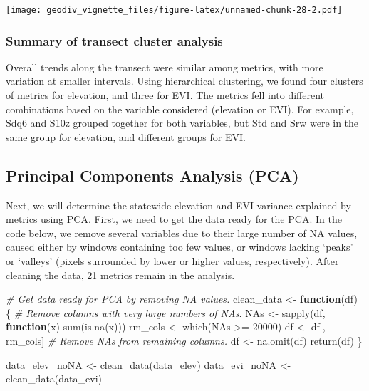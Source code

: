 \documentclass[
]{article}
\newenvironment{Shaded}{\begin{snugshade}}{\end{snugshade}}
\newcommand{\CommentTok}[1]{\textcolor[rgb]{0.56,0.35,0.01}{\textit{#1}}}
\newcommand{\ControlFlowTok}[1]{\textcolor[rgb]{0.13,0.29,0.53}{\textbf{#1}}}
\newcommand{\DecValTok}[1]{\textcolor[rgb]{0.00,0.00,0.81}{#1}}
\newcommand{\FunctionTok}[1]{\textcolor[rgb]{0.00,0.00,0.00}{#1}}
\newcommand{\NormalTok}[1]{#1}
\newcommand{\OtherTok}[1]{\textcolor[rgb]{0.56,0.35,0.01}{#1}}
\newcommand{\SpecialCharTok}[1]{\textcolor[rgb]{0.00,0.00,0.00}{#1}}
\begin{document}
\texttt{[image: geodiv\_vignette\_files/figure-latex/unnamed-chunk-28-2.pdf]}

\hypertarget{summary-of-transect-cluster-analysis}{%
\subsubsection{Summary of transect cluster
analysis}\label{summary-of-transect-cluster-analysis}}

Overall trends along the transect were similar among metrics, with more
variation at smaller intervals. Using hierarchical clustering, we found
four clusters of metrics for elevation, and three for EVI. The metrics
fell into different combinations based on the variable considered
(elevation or EVI). For example, Sdq6 and S10z grouped together for both
variables, but Std and Srw were in the same group for elevation, and
different groups for EVI.

\hypertarget{principal-components-analysis-pca}{%
\subsection{Principal Components Analysis
(PCA)}\label{principal-components-analysis-pca}}

Next, we will determine the statewide elevation and EVI variance
explained by metrics using PCA. First, we need to get the data ready for
the PCA. In the code below, we remove several variables due to their
large number of NA values, caused either by windows containing too few
values, or windows lacking `peaks' or `valleys' (pixels surrounded by
lower or higher values, respectively). After cleaning the data, 21
metrics remain in the analysis.

\begin{Shaded}
\begin{Highlighting}[]
\CommentTok{\# Get data ready for PCA by removing NA values.}
\NormalTok{clean\_data }\OtherTok{\textless{}{-}} \ControlFlowTok{function}\NormalTok{(df) \{}
  \CommentTok{\# Remove columns with very large numbers of NAs.}
\NormalTok{  NAs }\OtherTok{\textless{}{-}} \FunctionTok{sapply}\NormalTok{(df, }\ControlFlowTok{function}\NormalTok{(x) }\FunctionTok{sum}\NormalTok{(}\FunctionTok{is.na}\NormalTok{(x)))}
\NormalTok{  rm\_cols }\OtherTok{\textless{}{-}} \FunctionTok{which}\NormalTok{(NAs }\SpecialCharTok{\textgreater{}=} \DecValTok{20000}\NormalTok{)}
\NormalTok{  df }\OtherTok{\textless{}{-}}\NormalTok{ df[, }\SpecialCharTok{{-}}\NormalTok{rm\_cols]}
  \CommentTok{\# Remove NAs from remaining columns.}
\NormalTok{  df }\OtherTok{\textless{}{-}} \FunctionTok{na.omit}\NormalTok{(df)}
  \FunctionTok{return}\NormalTok{(df)}
\NormalTok{\}}

\NormalTok{data\_elev\_noNA }\OtherTok{\textless{}{-}} \FunctionTok{clean\_data}\NormalTok{(data\_elev)}
\NormalTok{data\_evi\_noNA }\OtherTok{\textless{}{-}} \FunctionTok{clean\_data}\NormalTok{(data\_evi)}
\end{Highlighting}
\end{Shaded}
\end{document}
